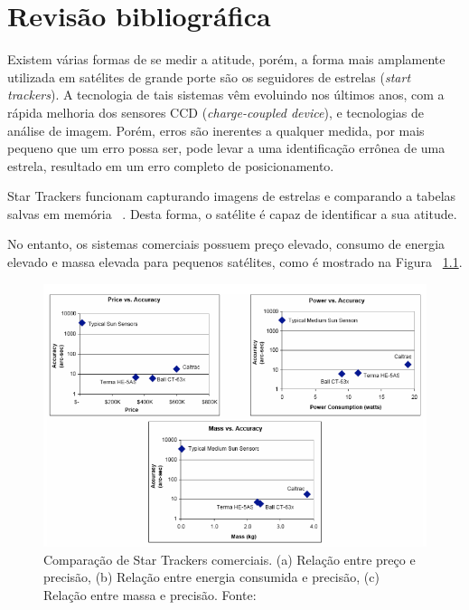 \chapter{Revisão bibliográfica}
\label{cap:Revisao_bibliografica_init}

Existem várias formas de se medir a atitude, porém, a forma mais amplamente utilizada em satélites de grande porte são os seguidores de estrelas (\textit{start trackers}). 
A tecnologia de tais sistemas vêm evoluindo nos últimos anos, com a rápida melhoria dos sensores CCD (\textit{charge-coupled device}), 
e tecnologias de análise de imagem. Porém,  erros são  inerentes a qualquer medida, por mais pequeno que um erro possa ser, pode levar a uma identificação errônea de uma estrela, resultado em um erro completo de posicionamento.

Star Trackers funcionam capturando imagens de estrelas e comparando a tabelas salvas em memória ~\cite[]{Diaz}. Desta forma, o satélite é capaz de identificar a sua atitude.

No entanto, os sistemas comerciais possuem preço elevado, consumo de energia elevado e massa elevada para pequenos satélites, como é mostrado na Figura ~\ref{fig:Comp_star_trackers_comerciais}.

\begin{figure}[!h]
	\centering
	\includegraphics[width=1\columnwidth]{images/comp_star_trackers.png}
	\caption{Comparação de Star Trackers comerciais. (a) Relação entre preço e precisão, (b) Relação entre energia consumida e precisão, (c) Relação entre massa e precisão. Fonte: ~\cite[]{Diaz}}
	\label{fig:Comp_star_trackers_comerciais}
\end{figure}
